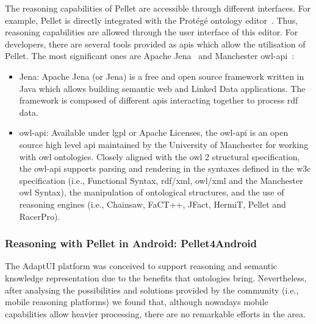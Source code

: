 The reasoning capabilities of Pellet are accessible through different interfaces.
For example, Pellet is directly integrated with the Protégé ontology 
editor~\citep{protege}. Thus, reasoning capabilities
are allowed through the user interface of this editor. For developers, there are
several tools provided as \acsp{api} which allow the utilisation of Pellet. The
most significant ones are Apache Jena~\citep{jena}
and Manchester \ac{owl}-\ac{api}~\citep{owlapi}:

\begin{itemize}
  \item Jena: Apache Jena (or Jena) is a free and open source framework written
  in Java which allows building semantic web and Linked Data applications. The
  framework is composed of different \acp{api} interacting together to process 
  \ac{rdf} data.
  
  \item \ac{owl}-\ac{api}: Available under \ac{lgpl} or Apache Licenses, the 
  \ac{owl}-\ac{api} is an open source high level \ac{api} maintained by the 
  University of Manchester for working with \ac{owl} ontologies. Closely aligned 
  with the \ac{owl} 2 structural specification, the \ac{owl}-\ac{api} supports 
  parsing and rendering in the syntaxes defined in the \ac{w3c} specification 
  (i.e., Functional Syntax, \ac{rdf}/\ac{xml}, \ac{owl}/\ac{xml} and the 
  Manchester \ac{owl} Syntax), the manipulation of ontological structures, and 
  the use of reasoning engines (i.e., Chainsaw, FaCT++, JFact, HermiT, Pellet 
  and RacerPro).  
\end{itemize}



\subsubsection{Reasoning with Pellet in Android: Pellet4Android}
\label{sec:pellet4android}

The AdaptUI platform was conceived to support reasoning and semantic knowledge
representation due to the benefits that ontologies bring. Nevertheless, after
analysing the possibilities and solutions provided by the community (i.e., mobile
reasoning platforms) we found that, although nowadays mobile capabilities allow
heavier processing, there are no remarkable efforts in the area.

